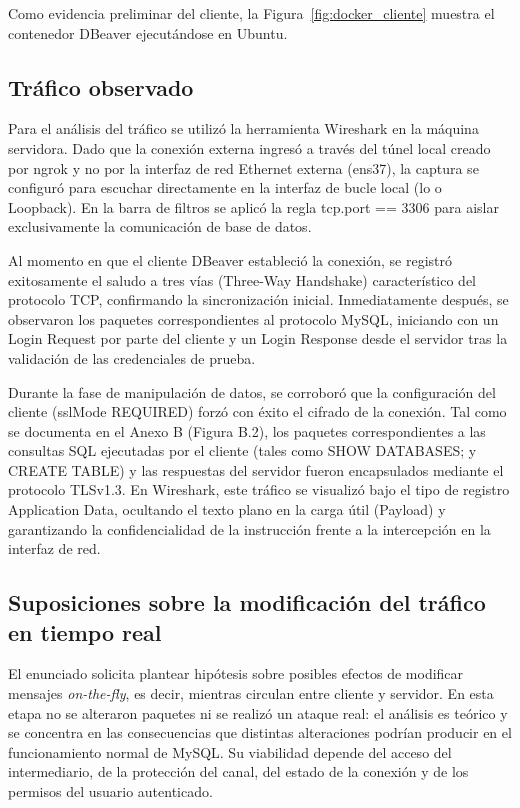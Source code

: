 \documentclass[10pt,a4paper]{article}
\begin{document}
Como evidencia preliminar del cliente, la Figura~\ref{fig:docker_cliente} muestra el contenedor DBeaver ejecutándose en Ubuntu.

\subsection{Tráfico observado}
Para el análisis del tráfico se utilizó la herramienta Wireshark en la máquina servidora. Dado que la conexión externa ingresó a través del túnel local creado por ngrok y no por la interfaz de red Ethernet externa (ens37), la captura se configuró para escuchar directamente en la interfaz de bucle local (lo o Loopback). En la barra de filtros se aplicó la regla tcp.port == 3306 para aislar exclusivamente la comunicación de base de datos.

Al momento en que el cliente DBeaver estableció la conexión, se registró exitosamente el saludo a tres vías (Three-Way Handshake) característico del protocolo TCP, confirmando la sincronización inicial. Inmediatamente después, se observaron los paquetes correspondientes al protocolo MySQL, iniciando con un Login Request por parte del cliente y un Login Response desde el servidor tras la validación de las credenciales de prueba.

Durante la fase de manipulación de datos, se corroboró que la configuración del cliente (sslMode REQUIRED) forzó con éxito el cifrado de la conexión. Tal como se documenta en el Anexo B (Figura B.2), los paquetes correspondientes a las consultas SQL ejecutadas por el cliente (tales como SHOW DATABASES; y CREATE TABLE) y las respuestas del servidor fueron encapsulados mediante el protocolo TLSv1.3. En Wireshark, este tráfico se visualizó bajo el tipo de registro Application Data, ocultando el texto plano en la carga útil (Payload) y garantizando la confidencialidad de la instrucción frente a la intercepción en la interfaz de red.
\newpage

\subsection{Suposiciones sobre la modificación del tráfico en tiempo real}
\label{sub:suposiciones}
El enunciado solicita plantear hipótesis sobre posibles efectos de modificar mensajes \emph{on-the-fly}, es decir, mientras circulan entre cliente y servidor. En esta etapa no se alteraron paquetes ni se realizó un ataque real: el análisis es teórico y se concentra en las consecuencias que distintas alteraciones podrían producir en el funcionamiento normal de MySQL. Su viabilidad depende del acceso del intermediario, de la protección del canal, del estado de la conexión y de los permisos del usuario autenticado.
\end{document}
